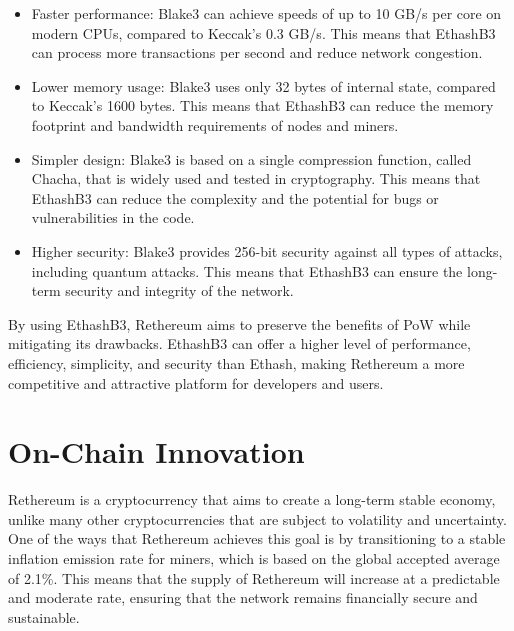 \documentclass[a4paper,onecolumn, superscriptaddress,10pt,accepted=2020-05-01,issue=1, volume=2, shorttitle=papers]{compositionalityarticle}
\begin{document}
\begin{itemize}
    \item Faster performance: Blake3 can achieve speeds of up to 10 GB/s per core on modern CPUs, compared to Keccak's 0.3 GB/s. This means that EthashB3 can process more transactions per second and reduce network congestion.
\end{itemize}
\begin{itemize}
    \item Lower memory usage: Blake3 uses only 32 bytes of internal state, compared to Keccak's 1600 bytes. This means that EthashB3 can reduce the memory footprint and bandwidth requirements of nodes and miners.
\end{itemize}
\begin{itemize}
    \item Simpler design: Blake3 is based on a single compression function, called Chacha, that is widely used and tested in cryptography. This means that EthashB3 can reduce the complexity and the potential for bugs or vulnerabilities in the code.
\end{itemize}
\begin{itemize}
    \item Higher security: Blake3 provides 256-bit security against all types of attacks, including quantum attacks. This means that EthashB3 can ensure the long-term security and integrity of the network.
\end{itemize}

\vspace{0.3cm}

By using EthashB3, Rethereum aims to preserve the benefits of PoW while mitigating its drawbacks. EthashB3 can offer a higher level of performance, efficiency, simplicity, and security than Ethash, making Rethereum a more competitive and attractive platform for developers and users.

\newpage

\section{On-Chain Innovation}
Rethereum is a cryptocurrency that aims to create a long-term stable economy, unlike many other cryptocurrencies that are subject to volatility and uncertainty. One of the ways that Rethereum achieves this goal is by transitioning to a stable inflation emission rate for miners, which is based on the global accepted average of 2.1\%. This means that the supply of Rethereum will increase at a predictable and moderate rate, ensuring that the network remains financially secure and sustainable.
\end{document}
